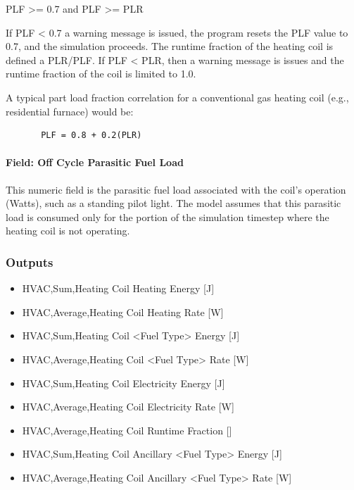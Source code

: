 PLF \textgreater{}= 0.7 and PLF \textgreater{}= PLR

If PLF \textless{} 0.7 a warning message is issued, the program resets the PLF value to 0.7, and the simulation proceeds. The runtime fraction of the heating coil is defined a PLR/PLF. If PLF \textless{} PLR, then a warning message is issues and the runtime fraction of the coil is limited to 1.0.

A typical part load fraction correlation for a conventional gas heating coil (e.g., residential furnace) would be:

\begin{lstlisting}
       PLF = 0.8 + 0.2(PLR)
\end{lstlisting}

\paragraph{Field: Off Cycle Parasitic Fuel Load}\label{field-parasitic-gas-load}

This numeric field is the parasitic fuel load associated with the coil's operation (Watts), such as a standing pilot light. The model assumes that this parasitic load is consumed only for the portion of the simulation timestep where the heating coil is not operating.

\subsubsection{Outputs}\label{outputs-9-002}

\begin{itemize}
\item
  HVAC,Sum,Heating Coil Heating Energy {[}J{]}
\item
  HVAC,Average,Heating Coil Heating Rate {[}W{]}
\item
  HVAC,Sum,Heating Coil <Fuel Type> Energy {[}J{]}
\item
  HVAC,Average,Heating Coil <Fuel Type> Rate {[}W{]}
\item
  HVAC,Sum,Heating Coil Electricity Energy {[}J{]}
\item
  HVAC,Average,Heating Coil Electricity Rate {[}W{]}
\item
  HVAC,Average,Heating Coil Runtime Fraction {[]}
\item
  HVAC,Sum,Heating Coil Ancillary <Fuel Type> Energy {[}J{]}
\item
  HVAC,Average,Heating Coil Ancillary <Fuel Type> Rate {[}W{]}
\end{itemize}

